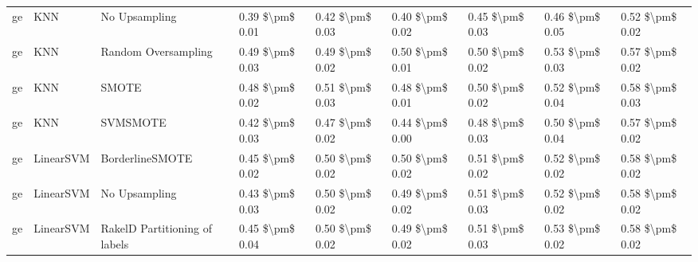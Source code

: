 \begin{tabular}{lllllllll}
      ge &                             KNN &                 No Upsampling & 0.39 \$\textbackslash pm\$ 0.01 &           0.42 \$\textbackslash pm\$ 0.03 &       0.40 \$\textbackslash pm\$ 0.02 &        0.45 \$\textbackslash pm\$ 0.03 &                         0.46 \$\textbackslash pm\$ 0.05 &     0.52 \$\textbackslash pm\$ 0.02 \\
      ge &                             KNN &           Random Oversampling & 0.49 \$\textbackslash pm\$ 0.03 &           0.49 \$\textbackslash pm\$ 0.02 &       0.50 \$\textbackslash pm\$ 0.01 &        0.50 \$\textbackslash pm\$ 0.02 &                         0.53 \$\textbackslash pm\$ 0.03 &     0.57 \$\textbackslash pm\$ 0.02 \\
      ge &                             KNN &                         SMOTE & 0.48 \$\textbackslash pm\$ 0.02 &           0.51 \$\textbackslash pm\$ 0.03 &       0.48 \$\textbackslash pm\$ 0.01 &        0.50 \$\textbackslash pm\$ 0.02 &                         0.52 \$\textbackslash pm\$ 0.04 &     0.58 \$\textbackslash pm\$ 0.03 \\
      ge &                             KNN &                      SVMSMOTE & 0.42 \$\textbackslash pm\$ 0.03 &           0.47 \$\textbackslash pm\$ 0.02 &       0.44 \$\textbackslash pm\$ 0.00 &        0.48 \$\textbackslash pm\$ 0.03 &                         0.50 \$\textbackslash pm\$ 0.04 &     0.57 \$\textbackslash pm\$ 0.02 \\
      ge &                       LinearSVM &               BorderlineSMOTE & 0.45 \$\textbackslash pm\$ 0.02 &           0.50 \$\textbackslash pm\$ 0.02 &       0.50 \$\textbackslash pm\$ 0.02 &        0.51 \$\textbackslash pm\$ 0.02 &                         0.52 \$\textbackslash pm\$ 0.02 &     0.58 \$\textbackslash pm\$ 0.02 \\
      ge &                       LinearSVM &                 No Upsampling & 0.43 \$\textbackslash pm\$ 0.03 &           0.50 \$\textbackslash pm\$ 0.02 &       0.49 \$\textbackslash pm\$ 0.02 &        0.51 \$\textbackslash pm\$ 0.03 &                         0.52 \$\textbackslash pm\$ 0.02 &     0.58 \$\textbackslash pm\$ 0.02 \\
      ge &                       LinearSVM & RakelD Partitioning of labels & 0.45 \$\textbackslash pm\$ 0.04 &           0.50 \$\textbackslash pm\$ 0.02 &       0.49 \$\textbackslash pm\$ 0.02 &        0.51 \$\textbackslash pm\$ 0.03 &                         0.53 \$\textbackslash pm\$ 0.02 &     0.58 \$\textbackslash pm\$ 0.02 \\

\end{tabular}
